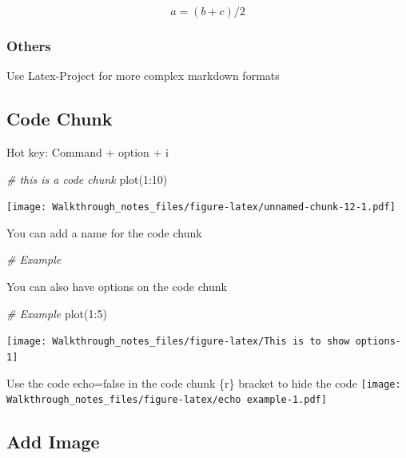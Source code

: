 \documentclass[
]{article}
\newenvironment{Shaded}{\begin{snugshade}}{\end{snugshade}}
\newcommand{\CommentTok}[1]{\textcolor[rgb]{0.56,0.35,0.01}{\textit{#1}}}
\newcommand{\DecValTok}[1]{\textcolor[rgb]{0.00,0.00,0.81}{#1}}
\newcommand{\FunctionTok}[1]{\textcolor[rgb]{0.00,0.00,0.00}{#1}}
\newcommand{\NormalTok}[1]{#1}
\newcommand{\SpecialCharTok}[1]{\textcolor[rgb]{0.00,0.00,0.00}{#1}}
\begin{document}
\[a=(b+c)/2\]

\hypertarget{others}{%
\subsubsection{Others}\label{others}}

Use Latex-Project for more complex markdown formats

\hypertarget{code-chunk}{%
\subsection{Code Chunk}\label{code-chunk}}

Hot key: Command + option + i

\begin{Shaded}
\begin{Highlighting}[]
\CommentTok{\# this is a code chunk}
\FunctionTok{plot}\NormalTok{(}\DecValTok{1}\SpecialCharTok{:}\DecValTok{10}\NormalTok{)}
\end{Highlighting}
\end{Shaded}

\texttt{[image: Walkthrough\_notes\_files/figure-latex/unnamed-chunk-12-1.pdf]}

You can add a name for the code chunk

\begin{Shaded}
\begin{Highlighting}[]
\CommentTok{\# Example}
\end{Highlighting}
\end{Shaded}

You can also have options on the code chunk

\begin{Shaded}
\begin{Highlighting}[]
\CommentTok{\# Example}
\FunctionTok{plot}\NormalTok{(}\DecValTok{1}\SpecialCharTok{:}\DecValTok{5}\NormalTok{)}
\end{Highlighting}
\end{Shaded}

\texttt{[image: Walkthrough\_notes\_files/figure-latex/This is to show options-1]}

Use the code echo=false in the code chunk \{r\} bracket to hide the code
\texttt{[image: Walkthrough\_notes\_files/figure-latex/echo example-1.pdf]}

\hypertarget{add-image}{%
\subsection{Add Image}\label{add-image}}
\end{document}
